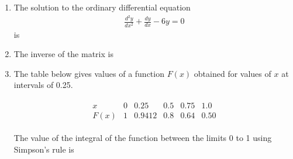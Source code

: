 \documentclass[journal,12pt,onecolumn]{IEEEtran}
\theoremstyle{remark}
\begin{document}
\begin{enumerate}
\noindent\item The solution to the ordinary differential equation
\begin{align*}
\frac{d^2y}{dx^2} + \frac{dy}{dx} - 6y = 0
\end{align*}
is
\hfill{}
\begin{enumerate}
\end{enumerate}
\item The inverse of the matrix  is
\hfill{}\newline
\begin{enumerate}
\end{enumerate}
\noindent\item The table below gives values of a function $F(x)$ obtained for values of $x$ at intervals of 0.25.

\begin{align*}
\begin{array}{c|c|c|c|c|c}
x & 0 & 0.25 & 0.5 & 0.75 & 1.0 \\
\hline
F(x) & 1 & 0.9412 & 0.8 & 0.64 & 0.50
\end{array}
\end{align*}

The value of the integral of the function between the limits 0 to 1 using Simpson's rule is
\\ \hfill{}
\begin{enumerate}
\end{enumerate}


\end{enumerate}
\end{document}
